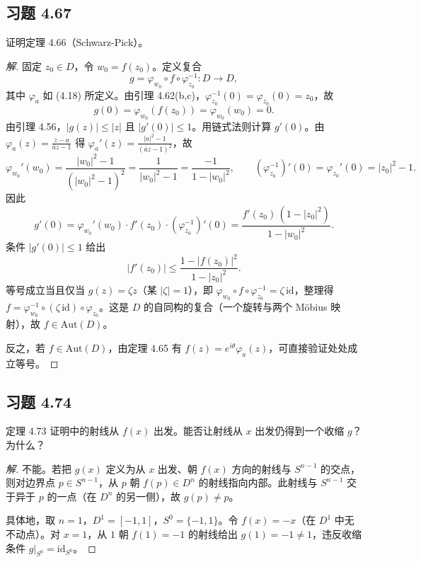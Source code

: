 \documentclass[11pt,a4paper]{article}
\theoremstyle{definition}
\newenvironment{solution}{\begin{proof}[解]}{\end{proof}}
\begin{document}
\subsection{习题 4.67}

证明定理 4.66（Schwarz-Pick）。

\begin{solution}
  固定 $z_0 \in D$，令 $w_0 = f(z_0)$。定义复合
  \[
    g = \varphi_{w_0} \circ f \circ \varphi_{z_0}^{-1} : D \to D,
  \]
  其中 $\varphi_a$ 如 (4.18) 所定义。由引理 4.62(b,c)，$\varphi_{z_0}^{-1}(0) = \varphi_{z_0}(0) = z_0$，故
  \[
    g(0) = \varphi_{w_0}(f(z_0)) = \varphi_{w_0}(w_0) = 0.
  \]
  由引理 4.56，$|g(z)| \le |z|$ 且 $|g'(0)| \le 1$。用链式法则计算 $g'(0)$。由 $\varphi_a(z) = \frac{z - a}{\bar{a}z - 1}$ 得 $\varphi_a'(z) = \frac{|a|^2 - 1}{(\bar{a}z - 1)^2}$，故
  \[
    \varphi_{w_0}'(w_0) = \frac{|w_0|^2 - 1}{(|w_0|^2 - 1)^2}
    = \frac{1}{|w_0|^2 - 1} = \frac{-1}{1 - |w_0|^2},
    \qquad
    (\varphi_{z_0}^{-1})'(0) = \varphi_{z_0}'(0) = |z_0|^2 - 1.
  \]
  因此
  \[
    g'(0) = \varphi_{w_0}'(w_0) \cdot f'(z_0) \cdot
    (\varphi_{z_0}^{-1})'(0)
    = \frac{f'(z_0)\,(1 - |z_0|^2)}{1 - |w_0|^2}.
  \]
  条件 $|g'(0)| \le 1$ 给出
  \[
    |f'(z_0)| \le \frac{1 - |f(z_0)|^2}{1 - |z_0|^2}.
  \]
  等号成立当且仅当 $g(z) = \zeta z$（某 $|\zeta| = 1$），即 $\varphi_{w_0} \circ f \circ \varphi_{z_0}^{-1} = \zeta \,\mathrm{id}$，整理得 $f = \varphi_{w_0}^{-1} \circ (\zeta\,\mathrm{id}) \circ \varphi_{z_0}$。这是 $D$ 的自同构的复合（一个旋转与两个 M\"obius 映射），故 $f \in \mathrm{Aut}(D)$。

  反之，若 $f \in \mathrm{Aut}(D)$，由定理 4.65 有 $f(z) = e^{i\theta}\varphi_a(z)$，可直接验证处处成立等号。
\end{solution}

\subsection{习题 4.74}

定理 4.73 证明中的射线从 $f(x)$ 出发。能否让射线从 $x$ 出发仍得到一个收缩 $g$？为什么？

\begin{solution}
  不能。若把 $g(x)$ 定义为从 $x$ 出发、朝 $f(x)$ 方向的射线与 $S^{n-1}$ 的交点，则对边界点 $p \in S^{n-1}$，从 $p$ 朝 $f(p) \in D^n$ 的射线指向内部。此射线与 $S^{n-1}$ 交于异于 $p$ 的一点（在 $D^n$ 的另一侧），故 $g(p) \ne p$。

  具体地，取 $n = 1$，$D^1 = [-1,1]$，$S^0 = \{-1, 1\}$。令 $f(x) = -x$（在 $D^1$ 中无不动点）。对 $x = 1$，从 $1$ 朝 $f(1) = -1$ 的射线给出 $g(1) = -1 \ne 1$，违反收缩条件 $g|_{S^0} = \mathrm{id}_{S^0}$。
\end{solution}
\end{document}
